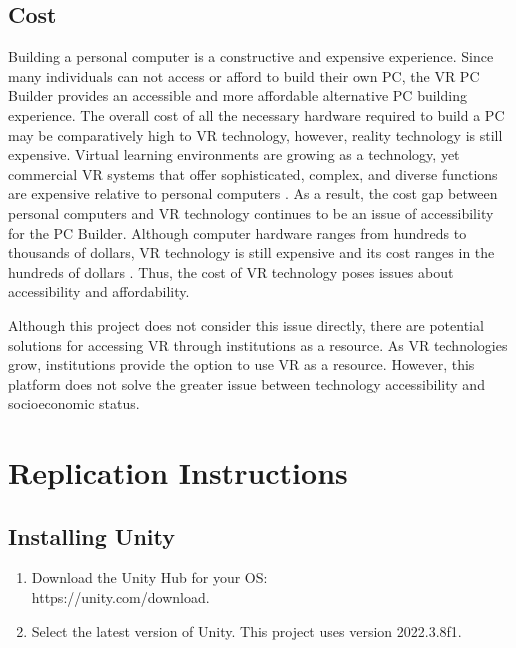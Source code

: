 \documentclass[10pt,twocolumn]{article}
\begin{document}
\subsection{Cost}

\par Building a personal computer is a constructive and expensive experience. Since many individuals can not access or afford to build their own PC, the VR PC Builder provides an accessible and more affordable alternative PC building experience. The overall cost of all the necessary hardware required to build a PC may be comparatively high to VR technology, however, reality technology is still expensive. Virtual learning environments are growing as a technology, yet commercial VR systems that offer sophisticated, complex, and diverse functions are expensive relative to personal computers \cite{Bricken1991VirtualRealityLearning}. As a result, the cost gap between personal computers and VR technology continues to be an issue of accessibility for the PC Builder. Although computer hardware ranges from hundreds to thousands of dollars, VR technology is still expensive and its cost ranges in the hundreds of dollars \cite{Alsop2023VRHeadsetAvg}. Thus, the cost of VR technology poses issues about accessibility and affordability.

\par Although this project does not consider this issue directly, there are potential solutions for accessing VR through institutions as a resource. As VR technologies grow, institutions provide the option to use VR as a resource. However, this platform does not solve the greater issue between technology accessibility and socioeconomic status.

\printbibliography

\appendix

\section{Replication Instructions}
\subsection{Installing Unity}

\begin{enumerate}
    \item Download the Unity Hub for your OS: \\https://unity.com/download.
    \item Select the latest version of Unity. This project uses version 2022.3.8f1.
\end{enumerate}
\end{document}
